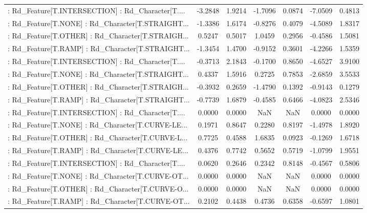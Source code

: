 \begin{longtable}{p{4cm}cccccc}
 : Rd\_Feature[T.INTERSECTION] : Rd\_Character[T.... & -3.2848 &    1.9214 & -1.7096 &       0.0874 & -7.0509 &  0.4813 \\
 : Rd\_Feature[T.NONE] : Rd\_Character[T.STRAIGHT... & -1.3386 &    1.6174 & -0.8276 &       0.4079 & -4.5089 &  1.8317 \\
 : Rd\_Feature[T.OTHER] : Rd\_Character[T.STRAIGH... &  0.5247 &    0.5017 &  1.0459 &       0.2956 & -0.4586 &  1.5081 \\
 : Rd\_Feature[T.RAMP] : Rd\_Character[T.STRAIGHT... & -1.3454 &    1.4700 & -0.9152 &       0.3601 & -4.2266 &  1.5359 \\
 : Rd\_Feature[T.INTERSECTION] : Rd\_Character[T.... & -0.3713 &    2.1843 & -0.1700 &       0.8650 & -4.6527 &  3.9100 \\
 : Rd\_Feature[T.NONE] : Rd\_Character[T.STRAIGHT... &  0.4337 &    1.5916 &  0.2725 &       0.7853 & -2.6859 &  3.5533 \\
 : Rd\_Feature[T.OTHER] : Rd\_Character[T.STRAIGH... & -0.3932 &    0.2659 & -1.4790 &       0.1392 & -0.9143 &  0.1279 \\
 : Rd\_Feature[T.RAMP] : Rd\_Character[T.STRAIGHT... & -0.7739 &    1.6879 & -0.4585 &       0.6466 & -4.0823 &  2.5346 \\
 : Rd\_Feature[T.INTERSECTION] : Rd\_Character[T.... &  0.0000 &    0.0000 &     NaN &          NaN &  0.0000 &  0.0000 \\
 : Rd\_Feature[T.NONE] : Rd\_Character[T.CURVE-LE... &  0.1971 &    0.8647 &  0.2280 &       0.8197 & -1.4978 &  1.8920 \\
 : Rd\_Feature[T.OTHER] : Rd\_Character[T.CURVE-L... &  0.7725 &    0.4588 &  1.6835 &       0.0923 & -0.1269 &  1.6718 \\
 : Rd\_Feature[T.RAMP] : Rd\_Character[T.CURVE-LE... &  0.4376 &    0.7742 &  0.5652 &       0.5719 & -1.0799 &  1.9551 \\
 : Rd\_Feature[T.INTERSECTION] : Rd\_Character[T.... &  0.0620 &    0.2646 &  0.2342 &       0.8148 & -0.4567 &  0.5806 \\
 : Rd\_Feature[T.NONE] : Rd\_Character[T.CURVE-OT... &  0.0000 &    0.0000 &     NaN &          NaN &  0.0000 &  0.0000 \\
 : Rd\_Feature[T.OTHER] : Rd\_Character[T.CURVE-O... &  0.0000 &    0.0000 &     NaN &          NaN &  0.0000 &  0.0000 \\
 : Rd\_Feature[T.RAMP] : Rd\_Character[T.CURVE-OT... &  0.2102 &    0.4438 &  0.4736 &       0.6358 & -0.6597 &  1.0801 \\

\end{longtable}
